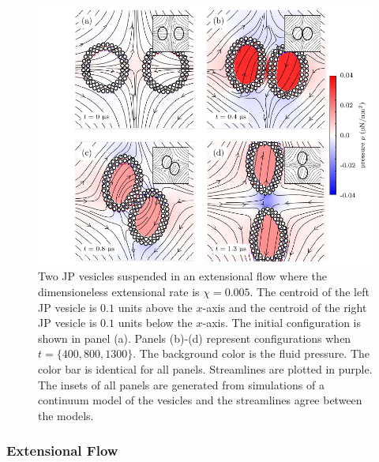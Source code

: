 \documentclass[lineno]{jfm}
\begin{document}
\begin{figure}
  \centering
  \includegraphics[width=\textwidth]{Figure12_Wrapper.pdf}
  \caption{\label{figure12} Two JP vesicles suspended in an
  extensional flow where the dimensioneless extensional rate is
  $\chi=0.005$. The centroid of the left JP vesicle is $0.1$ units
  above the $x$-axis and the centroid of the right JP vesicle is
  $0.1$ units below the $x$-axis. The initial configuration is shown in
  panel (a). Panels (b)-(d) represent configurations when $t = \{400, 800, 1300\}$. 
  The background color is the fluid pressure. The color bar
  is identical for all panels. Streamlines are plotted in purple. The
  insets of all panels are generated from simulations of a continuum
  model of the vesicles and the streamlines agree between the models.}
\end{figure}





\subsubsection{Extensional Flow}
\end{document}
